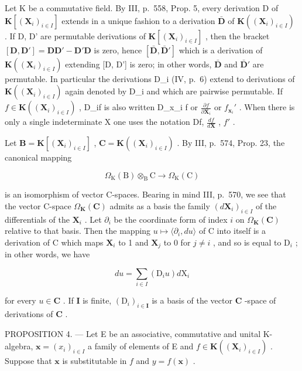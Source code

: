 Let K be a commutative field. By III, p.~558, Prop. 5, every derivation D of \(\mathbf{K}[(\mathbf{X}_i)_{i\in I}]\) extends in a unique fashion to a derivation \(\bar{\mathbf{D}}\) of \(\mathbf{K}((\mathbf{X}_i)_{i\in I})\) . If D, D' are permutable derivations of \(\mathbf{K}[(\mathbf{X}_i)_{i\in I}]\) , then the bracket \([\mathbf{D},\mathbf{D}'] = \mathbf{DD}' - \mathbf{D}'\mathbf{D}\) is zero, hence \([\bar{\mathbf{D}},\bar{\mathbf{D}}']\) which is a derivation of \(\mathbf{K}((\mathbf{X}_i)_{i\in I})\) extending {[}D, D'{]} is zero; in other words, \(\bar{\mathbf{D}}\) and \(\bar{\mathbf{D}}'\) are permutable. In particular the derivations D\_i (IV, p.~6) extend to derivations of \(\mathbf{K}((\mathbf{X}_i)_{i\in I})\) again denoted by D\_i and which are pairwise permutable. If \(f\in \mathbf{K}((\mathbf{X}_i)_{i\in I})\) , D\_if is also written D\_x\_i f or \(\frac{\partial f}{\partial\mathbf{X}_i}\) or \(f_{\mathbf{x}_i}'\) . When there is only a single indeterminate X one uses the notation Df, \(\frac{df}{d\mathbf{X}}\) , \(f'\) .

Let \(\mathbf{B} = \mathbf{K}[(\mathbf{X}_i)_{i \in I}]\) , \(\mathbf{C} = \mathbf{K}((\mathbf{X}_i)_{i \in I})\) . By III, p.~574, Prop. 23, the canonical mapping

\[
\Omega_ {\mathrm{K}} (\mathrm{B}) \otimes_ {\mathrm{B}} \mathrm{C} \rightarrow \Omega_ {\mathrm{K}} (\mathrm{C})
\]

is an isomorphism of vector C-spaces. Bearing in mind III, p.~570, we see that the vector C-space \(\Omega_{\mathbf{K}}(\mathbf{C})\) admits as a basis the family \((d\mathbf{X}_i)_{i\in I}\) of the differentials of the \(\mathbf{X}_i\) . Let \(\partial_i\) be the coordinate form of index \(i\) on \(\Omega_{\mathbf{K}}(\mathbf{C})\) relative to that basis. Then the mapping \(u\mapsto \langle \partial_i,du\rangle\) of C into itself is a derivation of C which maps \(\mathbf{X}_i\) to 1 and \(\mathbf{X}_j\) to 0 for \(j\neq i\) , and so is equal to \(\mathrm{D}_i\) ; in other words, we have

\[
d u = \sum_ {i \in I} \left(\mathrm{D} _ {i} u\right) d \mathrm{X} _ {i}\tag{1}
\]

for every \(u \in \mathbf{C}\) . If \(\mathbf{I}\) is finite, \((\mathrm{D}_i)_{i \in \mathbf{I}}\) is a basis of the vector \(\mathbf{C}\) -space of derivations of \(\mathbf{C}\) .

PROPOSITION 4. --- Let E be an associative, commutative and unital K-algebra, \(\mathbf{x} = (x_i)_{i \in I}\) a family of elements of E and \(f \in \mathbf{K}((\mathbf{X}_i)_{i \in I})\) . Suppose that \(\mathbf{x}\) is substitutable in \(f\) and \(y = f(\mathbf{x})\) .

